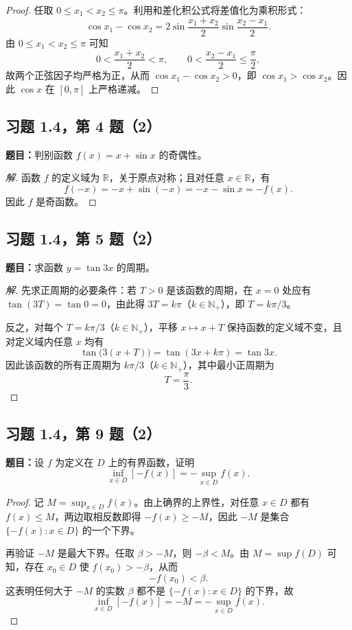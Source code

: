 \documentclass[UTF8, fontset=fandol, a4paper, 12pt]{ctexart}
\newcommand{\R}{\mathbb R}
\newcommand{\Nplus}{\mathbb N_{+}}
\theoremstyle{definition}
\begin{document}
\begin{proof}
任取 $0\le x_1<x_2\le\pi$。利用和差化积公式将差值化为乘积形式：
\[
 \cos x_1-\cos x_2
 =2\sin\frac{x_1+x_2}{2}\sin\frac{x_2-x_1}{2}.
\]
由 $0\le x_1<x_2\le\pi$ 可知
\[
 0<\frac{x_1+x_2}{2}<\pi,
 \qquad
 0<\frac{x_2-x_1}{2}\le\frac\pi2,
\]
故两个正弦因子均严格为正，从而 $\cos x_1-\cos x_2>0$，即 $\cos x_1>\cos x_2$。因此 $\cos x$ 在 $[0,\pi]$ 上严格递减。
\end{proof}

\subsection{习题 1.4，第 4 题（2）}
\noindent\textbf{题目：}判别函数 $f(x)=x+\sin x$ 的奇偶性。

\begin{proof}[解]
函数 $f$ 的定义域为 $\R$，关于原点对称；且对任意 $x\in\R$，有
\[
 f(-x)=-x+\sin(-x)=-x-\sin x=-f(x).
\]
因此 $f$ 是奇函数。
\end{proof}

\subsection{习题 1.4，第 5 题（2）}
\noindent\textbf{题目：}求函数 $y=\tan 3x$ 的周期。

\begin{proof}[解]
先求正周期的必要条件：若 $T>0$ 是该函数的周期，在 $x=0$ 处应有 $\tan(3T)=\tan0=0$，由此得 $3T=k\pi$（$k\in\Nplus$），即 $T=k\pi/3$。

反之，对每个 $T=k\pi/3$（$k\in\Nplus$），平移 $x\mapsto x+T$ 保持函数的定义域不变，且对定义域内任意 $x$ 均有
\[
 \tan\bigl(3(x+T)\bigr)=\tan(3x+k\pi)=\tan 3x.
\]
因此该函数的所有正周期为 $k\pi/3$（$k\in\Nplus$），其中最小正周期为
\[
 T=\frac\pi3.
\]
\end{proof}

\subsection{习题 1.4，第 9 题（2）}
\noindent\textbf{题目：}设 $f$ 为定义在 $D$ 上的有界函数，证明
\[
 \inf_{x\in D}[-f(x)]=-\sup_{x\in D}f(x).
\]
\begin{proof}
记 $M=\sup_{x\in D}f(x)$。由上确界的上界性，对任意 $x\in D$ 都有 $f(x)\le M$，两边取相反数即得 $-f(x)\ge-M$，因此 $-M$ 是集合 $\{-f(x):x\in D\}$ 的一个下界。

再验证 $-M$ 是最大下界。任取 $\beta>-M$，则 $-\beta<M$。由 $M=\sup f(D)$ 可知，存在 $x_0\in D$ 使 $f(x_0)>-\beta$，从而
\[
 -f(x_0)<\beta.
\]
这表明任何大于 $-M$ 的实数 $\beta$ 都不是 $\{-f(x):x\in D\}$ 的下界，故
\[
 \inf_{x\in D}[-f(x)]=-M=-\sup_{x\in D}f(x).
\]
\end{proof}
\end{document}
